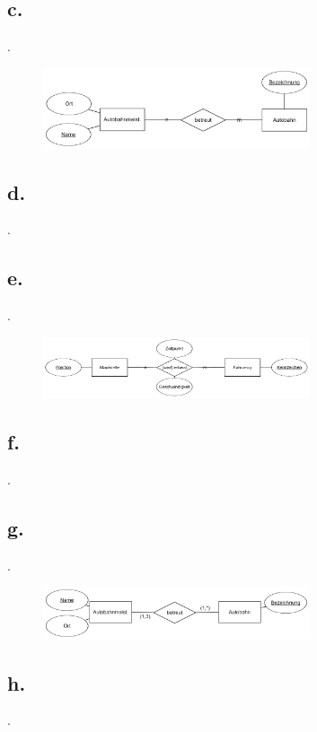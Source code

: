 \documentclass{article}
\begin{document}
		\subsection*{c.}
		.
			\begin{figure}[h]
				\includegraphics[width=0.7\textwidth]{aufgabe_1_2_c.png}
			\end{figure}
			
		
		\subsection*{d.}
		.
		
		\subsection*{e.}
		.
			\begin{figure}[h]
				\includegraphics[width=0.7\textwidth]{aufgabe_1_2_e.png}
			\end{figure}
		
		\subsection*{f.}
		.
		
		
		\pagebreak
		
		\subsection*{g.}
		.
			\begin{figure}[h]
				\includegraphics[width=0.7\textwidth]{aufgabe_1_2_g.png}
			\end{figure}
		
		\subsection*{h.}
		.
		
\end{document}
